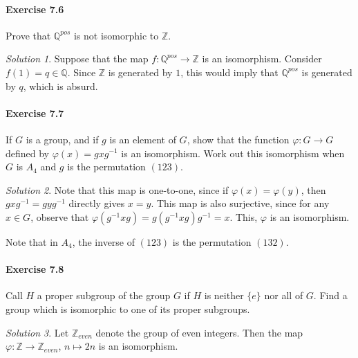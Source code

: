 \documentclass[11pt]{report}
\def\Q{\mathbb{Q}}
\def\Z{\mathbb{Z}}
\theoremstyle{remark}
\newtheorem*{solution}{Solution}
\begin{document}
    \paragraph{Exercise 7.6} Prove that $\Q^{pos}$ is not isomorphic to $\Z$.
    \begin{solution}
        Suppose that the map $f\colon \Q^{pos} \to \Z$ is an isomorphism. Consider
        $f(1) = q \in \Q$. Since $\Z$ is generated by $1$, this would imply that
        $\Q^{pos}$ is generated by $q$, which is absurd.
    \end{solution}

    \paragraph{Exercise 7.7} If $G$ is a group, and if $g$ is an element of $G$,
    show that the function $\varphi\colon G \to G$ defined by $\varphi(x) =
    gxg^{-1}$ is an isomorphism. Work out this isomorphism when $G$ is $A_4$ and $g$
    is the permutation $(123)$.
    \begin{solution}
        Note that this map is one-to-one, since if $\varphi(x) = \varphi(y)$, then
        $gxg^{-1} = gyg^{-1}$ directly gives $x = y$. This map is also surjective,
        since for any $x \in G$, observe that $\varphi(g^{-1}xg) = g(g^{-1}xg)g^{-1}
        = x$. This, $\varphi$ is an isomorphism.

        Note that in $A_4$, the inverse of $(123)$ is the permutation $(132)$.
    \end{solution}


    \paragraph{Exercise 7.8} Call $H$ a proper subgroup of the group $G$ if $H$ is
    neither $\{e\}$ nor all of $G$. Find a group which is isomorphic to one of its
    proper subgroups.
    \begin{solution}
        Let $\Z_{even}$ denote the group of even integers. Then the map
        $\varphi\colon \Z \to \Z_{even}$, $n \mapsto 2n$ is an isomorphism.
    \end{solution}
    
\end{document}

